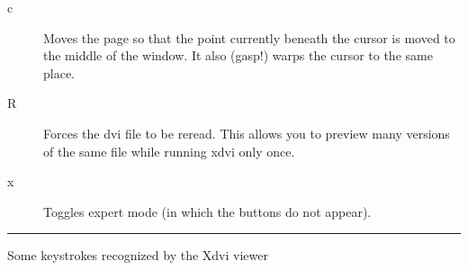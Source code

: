 \documentclass[a4paper,12pt]{article}
\begin{document}
\begin{table}
\begin{description}
\item[c]    Moves the page so that the point currently beneath  the
          cursor  is  moved to the middle of the window.  It also
          (gasp!) warps the cursor to the same place.
 
\item[R]    Forces the dvi file to be reread.  This allows  you  to
          preview  many  versions  of the same file while running
          xdvi only once.
 
\item[x]    Toggles expert mode (in which the buttons  do  not  appear).   
 
\end{description} 
\hrule
\caption{Some keystrokes recognized by the Xdvi viewer}
\end{table}
\end{document}
